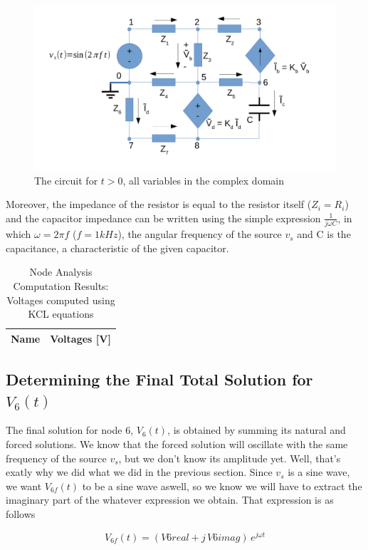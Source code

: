 \begin{figure}[h] \centering
\includegraphics[width=0.4\linewidth]{t2-t3456.pdf}
\caption{The circuit for $t>0$, all variables in the complex domain}
\label{fig5}
\end{figure}

Moreover, the impedance of the resistor is equal to the resistor itself ($Z_i = R_i$) and the capacitor impedance can be written using the simple expression $\frac{1}{j\omega C}$, in which $\omega = 2\pi f$ ($f =  1kHz$), the angular frequency of the source $v_s$ and C is the capacitance, a characteristic of the given capacitor. 

\begin{table}[h]
  \centering
  \begin{tabular}{|l|r|}
    \hline    
    {\bf Name} & {\bf Voltages [V]} \\ \hline
    
  \end{tabular}
  \caption{Node Analysis Computation Results: Voltages computed using KCL equations}
  \label{tab:nodeVoltages4}
\end{table}

\subsection{Determining the Final Total Solution for $V_6(t)$}

The final solution for node 6, $V_6(t)$, is obtained by summing its natural and forced solutions. We know that the forced solution will oscillate with the same frequency of the source $v_s$, but we don't know its amplitude yet. Well, that's exatly why we did what we did in the previous section. Since $v_s$ is a sine wave, we want $V_{6f}(t)$ to be a sine wave aswell, so we know we will have to extract the imaginary part of the whatever expression we obtain. That expression is as follows

\begin{center}
  \begin{equation}
    V_{6f}(t) = (V6real + j\,V6imag)\, e^{j\omega t}
  \end{equation} 
\end{center}

